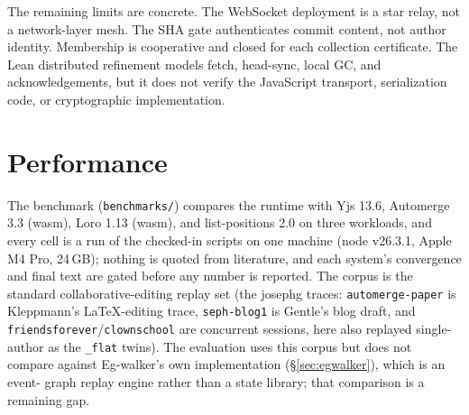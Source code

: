\documentclass[11pt]{article}
\newcommand{\code}[1]{\texttt{#1}}
\begin{document}
The remaining limits are concrete. The WebSocket deployment is a star relay,
not a network-layer mesh. The SHA gate authenticates commit content, not author
identity. Membership is cooperative and closed for each collection
certificate. The Lean distributed refinement models fetch, head-sync, local
GC, and acknowledgements, but it does not verify the JavaScript transport,
serialization code, or cryptographic implementation.

\section{Performance}
\label{sec:perf}

The benchmark (\code{benchmarks/}) compares the runtime with
Yjs 13.6, Automerge 3.3 (wasm), Loro 1.13 (wasm), and list-positions 2.0
on three workloads, and every cell is a run of the checked-in scripts on
one machine (node v26.3.1, Apple M4 Pro, 24\,GB); nothing is quoted from
literature, and each system's convergence and final text are gated before
any number is reported. The corpus is the standard collaborative-editing
replay set (the josephg traces: \code{automerge-paper} is Kleppmann's
LaTeX-editing trace, \code{seph-blog1} is Gentle's blog draft, and
\code{friendsforever}/\code{clownschool} are concurrent sessions, here
also replayed single-author as the \code{\_flat} twins). The evaluation
uses this corpus but does not compare against
Eg-walker's own implementation (\S\ref{sec:egwalker}), which is an event-
graph replay engine rather than a state library; that comparison is a
remaining gap.
\end{document}
